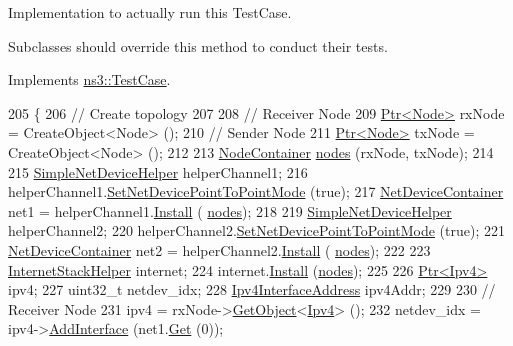 Implementation to actually run this Test\+Case. 

Subclasses should override this method to conduct their tests. 

Implements \hyperlink{classns3_1_1TestCase_a8ff74680cf017ed42011e4be51917a24}{ns3\+::\+Test\+Case}.


\begin{DoxyCode}
205 \{
206   \textcolor{comment}{// Create topology}
207 
208   \textcolor{comment}{// Receiver Node}
209   \hyperlink{classns3_1_1Ptr}{Ptr<Node>} rxNode = CreateObject<Node> ();
210   \textcolor{comment}{// Sender Node}
211   \hyperlink{classns3_1_1Ptr}{Ptr<Node>} txNode = CreateObject<Node> ();
212 
213   \hyperlink{classns3_1_1NodeContainer}{NodeContainer} \hyperlink{visualizer-ideas_8txt_a3e1b3808014a2c68ab0cd0182e041be2}{nodes} (rxNode, txNode);
214 
215   \hyperlink{classns3_1_1SimpleNetDeviceHelper}{SimpleNetDeviceHelper} helperChannel1;
216   helperChannel1.\hyperlink{classns3_1_1SimpleNetDeviceHelper_a474460ba6942d4933f443a97df7d4716}{SetNetDevicePointToPointMode} (\textcolor{keyword}{true});
217   \hyperlink{classns3_1_1NetDeviceContainer}{NetDeviceContainer} net1 = helperChannel1.\hyperlink{classns3_1_1SimpleNetDeviceHelper_a35bed9cee32d306362d3e24dfeef4513}{Install} (
      \hyperlink{visualizer-ideas_8txt_a3e1b3808014a2c68ab0cd0182e041be2}{nodes});
218 
219   \hyperlink{classns3_1_1SimpleNetDeviceHelper}{SimpleNetDeviceHelper} helperChannel2;
220   helperChannel2.\hyperlink{classns3_1_1SimpleNetDeviceHelper_a474460ba6942d4933f443a97df7d4716}{SetNetDevicePointToPointMode} (\textcolor{keyword}{true});
221   \hyperlink{classns3_1_1NetDeviceContainer}{NetDeviceContainer} net2 = helperChannel2.\hyperlink{classns3_1_1SimpleNetDeviceHelper_a35bed9cee32d306362d3e24dfeef4513}{Install} (
      \hyperlink{visualizer-ideas_8txt_a3e1b3808014a2c68ab0cd0182e041be2}{nodes});
222 
223   \hyperlink{classns3_1_1InternetStackHelper}{InternetStackHelper} internet;
224   internet.\hyperlink{classns3_1_1InternetStackHelper_a6645b412f31283d2d9bc3d8a95cebbc0}{Install} (\hyperlink{visualizer-ideas_8txt_a3e1b3808014a2c68ab0cd0182e041be2}{nodes});
225 
226   \hyperlink{classns3_1_1Ptr}{Ptr<Ipv4>} ipv4;
227   uint32\_t netdev\_idx;
228   \hyperlink{classns3_1_1Ipv4InterfaceAddress}{Ipv4InterfaceAddress} ipv4Addr;
229 
230   \textcolor{comment}{// Receiver Node}
231   ipv4 = rxNode->\hyperlink{classns3_1_1Object_a13e18c00017096c8381eb651d5bd0783}{GetObject}<\hyperlink{classns3_1_1Ipv4}{Ipv4}> ();
232   netdev\_idx = ipv4->\hyperlink{classns3_1_1Ipv4_a637354128b71bc587ea5a6eeaef42469}{AddInterface} (net1.\hyperlink{classns3_1_1NetDeviceContainer_a677d62594b5c9d2dea155cc5045f4d0b}{Get} (0));

\end{DoxyCode}
